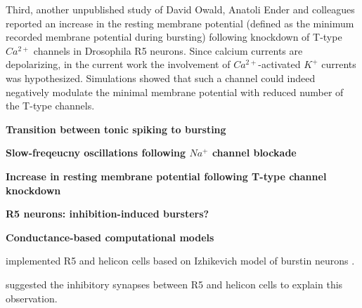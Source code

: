 \documentclass[../main.tex]{subfiles}
\begin{document}
Third, another unpublished study of David Owald, Anatoli Ender and colleagues reported an increase in the resting membrane potential (defined as the minimum recorded membrane potential during bursting) following knockdown of T-type $Ca^{2+}$ channels in Drosophila R5 neurons. Since calcium currents are depolarizing, in the current work the involvement of $Ca^{2+}$-activated $K^+$ currents was hypothesized. Simulations showed that such a channel could indeed negatively modulate the minimal membrane potential with reduced number of the T-type channels.

\vspace*{0.3cm}
\noindent\textbf{Transition between tonic spiking to bursting}



\vspace*{0.3cm}
\noindent\textbf{Slow-freqeucny oscillations following $Na^{+}$ channel blockade}

\vspace*{0.3cm}
\noindent\textbf{Increase in resting membrane potential following T-type channel knockdown}


\vspace*{0.3cm}
\noindent\textbf{R5 neurons: inhibition-induced bursters?}


\vspace*{0.3cm}
\noindent\textbf{Conductance-based computational models}




\color{orange}

\parencite{krummSlowlyOscillatingBrain2021} implemented R5 and helicon cells based
on Izhikevich model of burstin neurons \parencite{izhikevichSimpleModelSpiking2003}.

\parencite{krummSlowlyOscillatingBrain2021} suggested the inhibitory synapses between R5 and
helicon cells to explain this observation.

\color{red}
\end{document}

